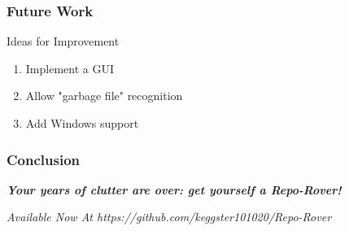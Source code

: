 \documentclass{beamer}
\begin{document}







\begin{frame}
    \centering
    \frametitle{Future Work}
    
    \begin{block}{Ideas for Improvement}
    		\begin{enumerate}
    			\item Implement a GUI
    			\item Allow "garbage file" recognition
    			\item Add Windows support
    		\end{enumerate}
    \end{block}
    
\end{frame}

\begin{frame}
    \centering
    \frametitle{Conclusion}
    \begin{block}{}
    \begin{center}
	\emph{\huge{\textbf{Your years of clutter are over: get yourself a Repo-Rover!}}}
    \end{center}
    \end{block}
	\vspace{1.75cm}
    \begin{block}{}
    \begin{center}
    \emph{\Large{Available Now At \emph{https://github.com/keggster101020/Repo-Rover}}}
    \end{center}
    \end{block}
\end{frame}


\end{document}
